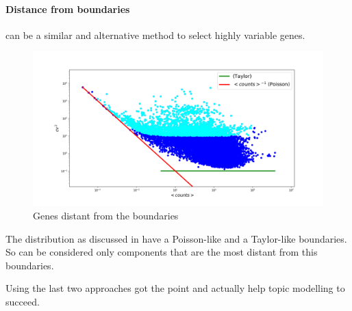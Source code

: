 \paragraph{Distance from boundaries} can be a similar and alternative method to select highly variable genes.
\begin{figure}[htb!]
    \centering
    \includegraphics[width=0.8\linewidth]{pictures/topic/cvmean_oversampling.png}
    \caption{Genes distant from the boundaries}
    \label{fig:topic/cvmean_oversampling}
\end{figure}
The distribution as discussed in  have a Poisson-like and a Taylor-like boundaries. So can be considered only components that are the most distant from this boundaries.

Using the last two approaches got the point and actually help topic modelling to succeed.
